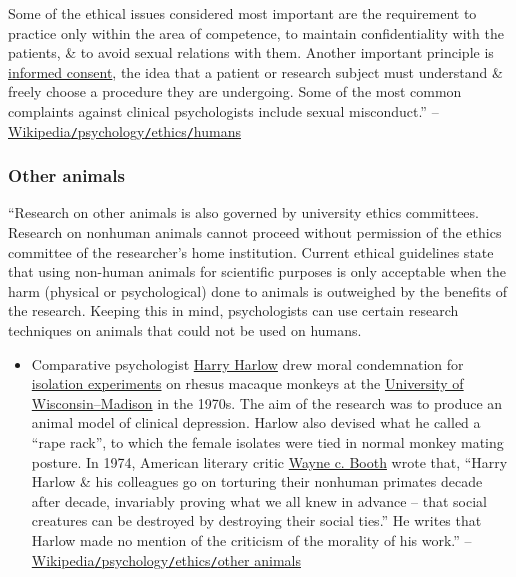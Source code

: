 \documentclass[oneside]{book}
\numberwithin{equation}{section}
\begin{document}
Some of the ethical issues considered most important are the requirement to practice only within the area of competence, to maintain confidentiality with the patients, \& to avoid sexual relations with them. Another important principle is \href{https://en.wikipedia.org/wiki/Informed_consent}{informed consent}, the idea that a patient or research subject must understand \& freely choose a procedure they are undergoing. Some of the most common complaints against clinical psychologists include sexual misconduct.'' -- \href{https://en.wikipedia.org/wiki/Psychology#Humans}{Wikipedia\texttt{/}psychology\texttt{/}ethics\texttt{/}humans}

\subsubsection{Other animals}
``Research on other animals is also governed by university ethics committees. Research on nonhuman animals cannot proceed without permission of the ethics committee of the researcher's home institution. Current ethical guidelines state that using non-human animals for scientific purposes is only acceptable when the harm (physical or psychological) done to animals is outweighed by the benefits of the research. Keeping this in mind, psychologists can use certain research techniques on animals that could not be used on humans.
\begin{itemize}
	\item Comparative psychologist \href{https://en.wikipedia.org/wiki/Harry_Harlow}{Harry Harlow} drew moral condemnation for \href{https://en.wikipedia.org/wiki/Pit_of_despair}{isolation experiments} on rhesus macaque monkeys at the \href{https://en.wikipedia.org/wiki/University_of_Wisconsin--Madison}{University of Wisconsin--Madison} in the 1970s. The aim of the research was to produce an animal model of clinical depression. Harlow also devised what he called a ``rape rack'', to which the female isolates were tied in normal monkey mating posture. In 1974, American literary critic \href{https://en.wikipedia.org/wiki/Wayne_C._Booth}{Wayne c. Booth} wrote that, ``Harry Harlow \& his colleagues go on torturing their nonhuman primates decade after decade, invariably proving what we all knew in advance -- that social creatures can be destroyed by destroying their social ties.'' He writes that Harlow made no mention of the criticism of the morality of his work.'' -- \href{https://en.wikipedia.org/wiki/Psychology#Other_animals}{Wikipedia\texttt{/}psychology\texttt{/}ethics\texttt{/}other animals}
\end{itemize}
\end{document}
